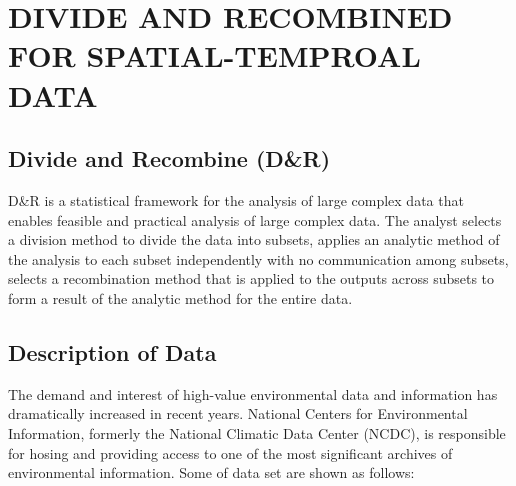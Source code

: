 \chapter{DIVIDE AND RECOMBINED FOR SPATIAL-TEMPROAL DATA}

\section{Divide and Recombine (D\&R)}

D\&R \cite{Guha:2012} is a statistical framework for the analysis of large complex
data that enables feasible and practical analysis of large complex data. The 
analyst selects a division method to divide the data into subsets, applies an 
analytic method of the analysis to each subset independently with no communication
among subsets, selects a recombination method that is applied to the outputs 
across subsets to form a result of the analytic method for the entire data.

\section{Description of Data}

The demand and interest of high-value environmental data and information has 
dramatically increased in recent years.
National Centers for Environmental Information, formerly the National
Climatic Data Center (NCDC), is responsible for hosing and providing access to
one of the most significant archives of environmental information. Some of data 
set are shown as follows:

